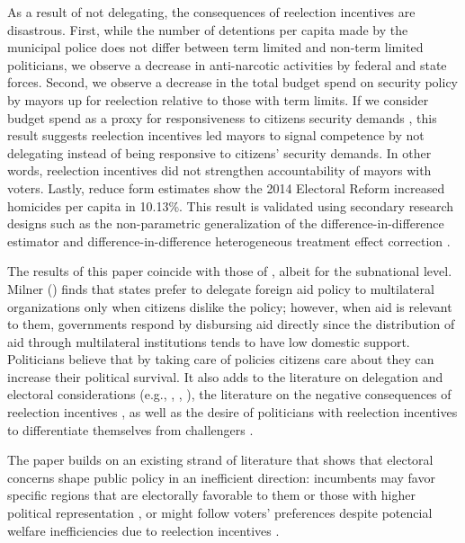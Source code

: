 As a result of not delegating, the consequences of reelection incentives are disastrous. First, while the number of detentions per capita made by the municipal police does not differ between term limited and non-term limited politicians, we observe a decrease in anti-narcotic activities by federal and state forces. Second, we observe a decrease in the total budget spend on security policy by mayors up for reelection relative to those with term limits. If we consider budget spend as a proxy for responsiveness to citizens security demands \citep{carreri_2020}, this result suggests reelection incentives led mayors to signal competence by not delegating instead of being responsive to citizens' security demands. In other words, reelection incentives did not strengthen accountability of mayors with voters. Lastly, reduce form estimates show the 2014 Electoral Reform increased homicides per capita in 10.13\%. This result is validated using secondary research designs such as the non-parametric generalization of the difference-in-difference estimator \citep{imai_etal_2020} and difference-in-difference heterogeneous treatment effect correction \citep{chaisemarting_etal_2019}.       

   
The results of this paper coincide with those of \citet{milner_2004}, albeit for the subnational level. Milner (\citeyear{milner_2004}) finds that states prefer to delegate foreign aid policy to multilateral organizations only when citizens dislike the policy; however, when aid is relevant to them, governments respond by disbursing aid directly since the distribution of aid through multilateral institutions tends to have low domestic support. Politicians believe that by taking care of policies citizens care about they can increase their political survival. It also adds to the literature on delegation and electoral considerations (e.g., \citet{mccubbins_1991}, \citet{fiorina_1982}, \citet{loftis_2014}), the literature on the negative consequences of reelection incentives \citep{coviello_etal_2017}, as well as the desire of politicians with reelection incentives to differentiate themselves from challengers \citep{motolinia_2020}.             

The paper builds on an existing strand of literature that shows that electoral concerns shape public policy in an inefficient direction: incumbents may favor specific regions that are electorally favorable to them \citep{schady_2000, Miguel_zaidi_2003, cole_2004, khemani_2007} or those with higher political representation  \citep{wright_1974, porto_2001, ansolabehere_etal_2002}, or might follow voters’ preferences despite potencial welfare inefficiencies due to reelection incentives \citep{pulejo_querubin_2021}.  


